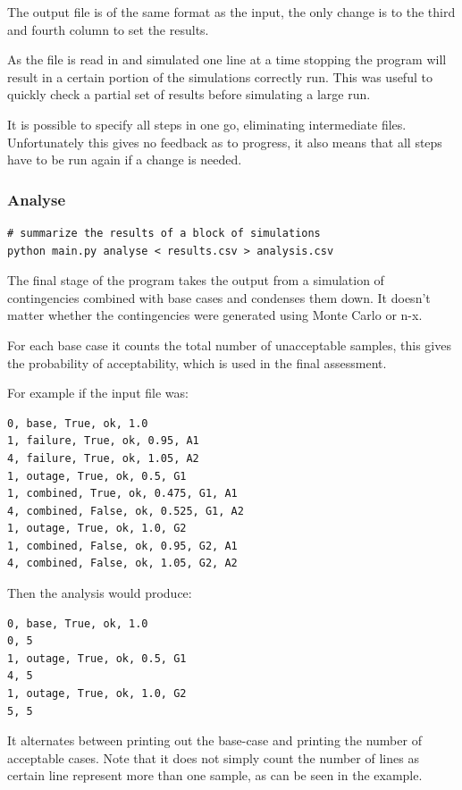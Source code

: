 \documentclass[a4paper,oneside,12pt]{report}
\begin{document}
The output file is of the same format as the input, the only change is
to the third and fourth column to set the results.

As the file is read in and simulated one line at a time stopping the program will result in a certain portion of the simulations correctly run. This was useful to quickly check a partial set of results before simulating a large run.

It is possible to specify all steps in one go, eliminating intermediate
files. Unfortunately this gives no feedback as to progress, it also means
that all steps have to be run again if a change is needed.

\subsubsection{Analyse}

\begin{verbatim}
# summarize the results of a block of simulations
python main.py analyse < results.csv > analysis.csv
\end{verbatim}

The final stage of the program takes the output from a simulation of
contingencies combined with base cases and condenses them down. It
doesn't matter whether the contingencies were generated using Monte
Carlo or n-x.

For each base case it counts the total number of unacceptable samples,
this gives the probability of acceptability, which is used in the final
assessment.

For example if the input file was:

\begin{verbatim}
0, base, True, ok, 1.0
1, failure, True, ok, 0.95, A1
4, failure, True, ok, 1.05, A2
1, outage, True, ok, 0.5, G1
1, combined, True, ok, 0.475, G1, A1
4, combined, False, ok, 0.525, G1, A2
1, outage, True, ok, 1.0, G2
1, combined, False, ok, 0.95, G2, A1
4, combined, False, ok, 1.05, G2, A2
\end{verbatim}

Then the analysis would produce:

\begin{verbatim}
0, base, True, ok, 1.0
0, 5
1, outage, True, ok, 0.5, G1
4, 5
1, outage, True, ok, 1.0, G2
5, 5
\end{verbatim}

It alternates between printing out the base-case and printing the number
of acceptable cases. Note that it does not simply count the number of
lines as certain line represent more than one sample, as can be seen in
the example.
\end{document}
